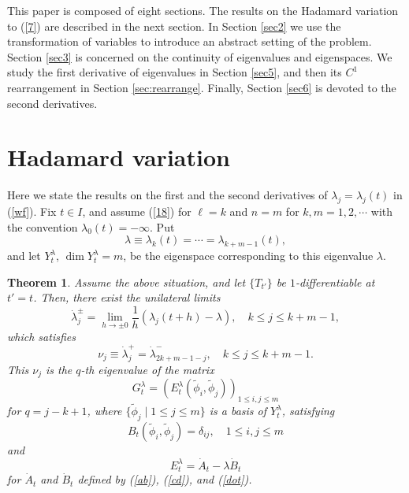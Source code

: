 \documentclass[final,a4paper]{jmsj}
\theoremstyle{thmstyleone}%
\newtheorem{theorem}{Theorem}
\theoremstyle{thmstyletwo}%
\theoremstyle{thmstylethree}%
\begin{document}
This paper is composed of eight sections. The results on the Hadamard variation to (\ref{7}) are described in the next section. In Section \ref{sec2} we use the transformation of variables to introduce an abstract setting of the problem. Section \ref{sec3} is concerned on the continuity of eigenvalues and eigenspaces. We study the first derivative of eigenvalues in Section \ref{sec5}, and then its $C^1$ rearrangement in Section \ref{sec:rearrange}.  Finally, Section \ref{sec6} is devoted to the second derivatives.  


\section{Hadamard variation}\label{summary} 

Here we state the results on the first and the second derivatives of $\lambda_j=\lambda_j(t)$ in (\ref{wf}).  Fix $t\in I$, and assume (\ref{18}) for $\ell=k$ and $n=m$ for $k,m=1,2,\cdots$ with  the convention $\lambda_{0}(t)=-\infty$. Put   
\begin{equation}
\lambda\equiv \lambda_k(t)=\cdots=\lambda_{k+m-1}(t),  
 \label{put}
\end{equation} 
and let $Y^\lambda_t$, $\dim Y^\lambda_t=m$, be the eigenspace corresponding to this eigenvalue $\lambda$. 

\begin{theorem}\label{thm2.1} 
Assume the above situation, and let $\{T_{t'}\}$ be $1$-differentiable at $t'=t$. Then, there exist the unilateral limits  
\[ \dot\lambda_j^\pm=\lim_{h\rightarrow \pm 0}\frac{1}{h}(\lambda_j(t+h)-\lambda), \quad k\leq j\leq k+m-1, \] 
which satisfies  
\begin{equation} 
\nu_j\equiv \dot \lambda_j^+=\dot \lambda_{2k+m-1-j}^-, \quad k\leq j\leq k+m-1. 
 \label{derivative}
\end{equation} 
This $\nu_j$ is the $q$-th eigenvalue of the matrix 
\begin{equation} 
G^\lambda_t=\left( E^\lambda_t(\tilde \phi_i, \tilde \phi_j)\right)_{1\leq i, j\leq m} 
 \label{glambda}
\end{equation} 
for $q=j-k+1$, where $\{ \tilde \phi_j \mid 1\leq j\leq m\}$ is a basis of $Y^\lambda_t$, satisfying 
\begin{equation} 
B_t(\tilde \phi_i, \tilde \phi_j) =\delta_{ij}, \quad 1\leq i, j\leq m 
 \label{deltil}
\end{equation} 
and 
\[ E^\lambda_t=\dot A_t-\lambda \dot B_t \]
for $\dot A_t$ and $\dot B_t$ defined by (\ref{ab}), (\ref{cd}), and (\ref{dot}).  
\end{theorem} 
\end{document}

